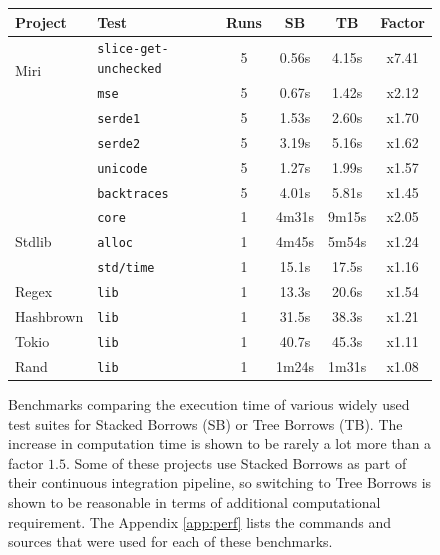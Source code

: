 \documentclass[a4paper,11pt]{article}
\theoremstyle{plain}
\theoremstyle{definition}
\theoremstyle{remark}
\begin{document}
\begin{figure}
    \centering
    \begin{tabular}{|l|l|c|c|c|c|}
        \hline
        Project & Test & Runs & SB & TB & Factor \\
        \hline
        \multirow{2}{9em}{Miri}
            & \texttt{slice-get-unchecked} & 5 & 0.56s & 4.15s & {\color{Red}x7.41} \\
            & \texttt{mse} & 5 & 0.67s & 1.42s & {\color{Red}x2.12} \\
            & \texttt{serde1} & 5 & 1.53s & 2.60s & {\color{YellowOrange}x1.70} \\
            & \texttt{serde2} & 5 & 3.19s & 5.16s & {\color{YellowOrange}x1.62} \\
            & \texttt{unicode} & 5 & 1.27s & 1.99s & {\color{YellowOrange}x1.57} \\
            & \texttt{backtraces} & 5 & 4.01s & 5.81s & {\color{YellowOrange}x1.45} \\
        \hline
        \multirow{3}{9em}{Stdlib}
            & \texttt{core} & 1 & 4m31s & 9m15s & {\color{Red}x2.05} \\
            & \texttt{alloc} & 1 & 4m45s & 5m54s & {\color{LimeGreen}x1.24} \\
            & \texttt{std/time} & 1 & 15.1s & 17.5s & {\color{LimeGreen}x1.16} \\
        \hline
        \multirow{1}{9em}{Regex}
            & \texttt{lib} & 1 & 13.3s & 20.6s & {\color{YellowOrange}x1.54} \\
        \multirow{1}{9em}{Hashbrown}
            & \texttt{lib} & 1 & 31.5s & 38.3s & {\color{LimeGreen}x1.21} \\
        \multirow{1}{9em}{Tokio}
            & \texttt{lib} & 1 & 40.7s & 45.3s & {\color{LimeGreen}x1.11} \\
        \multirow{1}{9em}{Rand}
            & \texttt{lib} & 1 & 1m24s & 1m31s & {\color{LimeGreen}x1.08} \\
        \hline
    \end{tabular}
    \caption{
        Benchmarks comparing the execution time of various widely used test suites
        for Stacked Borrows (SB) or Tree Borrows (TB). The increase in computation time
        is shown to be rarely a lot more than a factor \(1.5\).
        Some of these projects use Stacked Borrows as part of their continuous integration
        pipeline, so switching to Tree Borrows is shown to be reasonable in terms of
        additional computational requirement.
        The Appendix \ref{app:perf} lists the commands and sources
        that were used for each of these benchmarks.
    }
    \label{fig:perf}
\end{figure}
\end{document}
